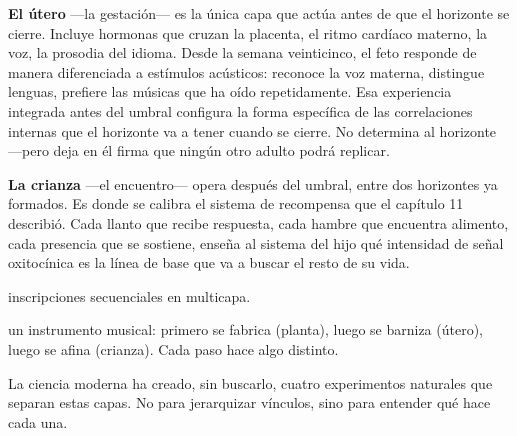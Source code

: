 \textbf{El útero} —la gestación— es la única capa que actúa antes de que el horizonte se cierre. Incluye hormonas que cruzan la placenta, el ritmo cardíaco materno, la voz, la prosodia del idioma. Desde la semana veinticinco, el feto responde de manera diferenciada a estímulos acústicos: reconoce la voz materna, distingue lenguas, prefiere las músicas que ha oído repetidamente. Esa experiencia integrada antes del umbral configura la forma específica de las correlaciones internas que el horizonte va a tener cuando se cierre. No determina al horizonte —pero deja en él firma que ningún otro adulto podrá replicar.

\textbf{La crianza} —el encuentro— opera después del umbral, entre dos horizontes ya formados. Es donde se calibra el sistema de recompensa que el capítulo 11 describió. Cada llanto que recibe respuesta, cada hambre que encuentra alimento, cada presencia que se sostiene, enseña al sistema del hijo qué intensidad de señal oxitocínica es la línea de base que va a buscar el resto de su vida.

\begin{fisica}
 inscripciones secuenciales en multicapa.

 un instrumento musical: primero se fabrica (planta), luego se barniza (útero), luego se afina (crianza). Cada paso hace algo distinto.
\end{fisica}
\noindent La ciencia moderna ha creado, sin buscarlo, cuatro experimentos naturales que separan estas capas. No para jerarquizar vínculos, sino para entender qué hace cada una.

